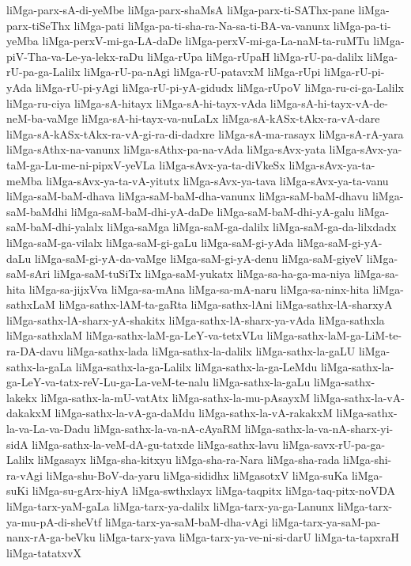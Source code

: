 {liMga-parx-sA-di-yeMbe
liMga-parx-shaMsA
liMga-parx-ti-SAThx-pane
liMga-parx-tiSeThx
liMga-pati
liMga-pa-ti-sha-ra-Na-sa-ti-BA-va-vanunx
liMga-pa-ti-yeMba
liMga-perxV-mi-ga-LA-daDe
liMga-perxV-mi-ga-La-naM-ta-ruMTu
liMga-piV-Tha-va-Le-ya-lekx-raDu
liMga-rUpa
liMga-rUpaH
liMga-rU-pa-dalilx
liMga-rU-pa-ga-Lalilx
liMga-rU-pa-nAgi
liMga-rU-patavxM
liMga-rUpi
liMga-rU-pi-yAda
liMga-rU-pi-yAgi
liMga-rU-pi-yA-gidudx
liMga-rUpoV
liMga-ru-ci-ga-Lalilx
liMga-ru-ciya
liMga-sA-hitayx
liMga-sA-hi-tayx-vAda
liMga-sA-hi-tayx-vA-de-neM-ba-vaMge
liMga-sA-hi-tayx-va-nuLaLx
liMga-sA-kASx-tAkx-ra-vA-dare
liMga-sA-kASx-tAkx-ra-vA-gi-ra-di-dadxre
liMga-sA-ma-rasayx
liMga-sA-rA-yara
liMga-sAthx-na-vanunx
liMga-sAthx-pa-na-vAda
liMga-sAvx-yata
liMga-sAvx-ya-taM-ga-Lu-me-ni-pipxV-yeVLa
liMga-sAvx-ya-ta-diVkeSx
liMga-sAvx-ya-ta-meMba
liMga-sAvx-ya-ta-vA-yitutx
liMga-sAvx-ya-tava
liMga-sAvx-ya-ta-vanu
liMga-saM-baM-dhava
liMga-saM-baM-dha-vanunx
liMga-saM-baM-dhavu
liMga-saM-baMdhi
liMga-saM-baM-dhi-yA-daDe
liMga-saM-baM-dhi-yA-galu
liMga-saM-baM-dhi-yalalx
liMga-saMga
liMga-saM-ga-dalilx
liMga-saM-ga-da-lilxdadx
liMga-saM-ga-vilalx
liMga-saM-gi-gaLu
liMga-saM-gi-yAda
liMga-saM-gi-yA-daLu
liMga-saM-gi-yA-da-vaMge
liMga-saM-gi-yA-denu
liMga-saM-giyeV
liMga-saM-sAri
liMga-saM-tuSiTx
liMga-saM-yukatx
liMga-sa-ha-ga-ma-niya
liMga-sa-hita
liMga-sa-jijxVva
liMga-sa-mAna
liMga-sa-mA-naru
liMga-sa-ninx-hita
liMga-sathxLaM
liMga-sathx-lAM-ta-gaRta
liMga-sathx-lAni
liMga-sathx-lA-sharxyA
liMga-sathx-lA-sharx-yA-shakitx
liMga-sathx-lA-sharx-ya-vAda
liMga-sathxla
liMga-sathxlaM
liMga-sathx-laM-ga-LeY-va-tetxVLu
liMga-sathx-laM-ga-LiM-te-ra-DA-davu
liMga-sathx-lada
liMga-sathx-la-dalilx
liMga-sathx-la-gaLU
liMga-sathx-la-gaLa
liMga-sathx-la-ga-Lalilx
liMga-sathx-la-ga-LeMdu
liMga-sathx-la-ga-LeY-va-tatx-reV-Lu-ga-La-veM-te-nalu
liMga-sathx-la-gaLu
liMga-sathx-lakekx
liMga-sathx-la-mU-vatAtx
liMga-sathx-la-mu-pAsayxM
liMga-sathx-la-vA-dakakxM
liMga-sathx-la-vA-ga-daMdu
liMga-sathx-la-vA-rakakxM
liMga-sathx-la-va-La-va-Dadu
liMga-sathx-la-va-nA-cAyaRM
liMga-sathx-la-va-nA-sharx-yi-sidA
liMga-sathx-la-veM-dA-gu-tatxde
liMga-sathx-lavu
liMga-savx-rU-pa-ga-Lalilx
liMgasayx
liMga-sha-kitxyu
liMga-sha-ra-Nara
liMga-sha-rada
liMga-shi-ra-vAgi
liMga-shu-BoV-da-yaru
liMga-sididhx
liMgasotxV
liMga-suKa
liMga-suKi
liMga-su-gArx-hiyA
liMga-swthxlayx
liMga-taqpitx
liMga-taq-pitx-noVDA
liMga-tarx-yaM-gaLa
liMga-tarx-ya-dalilx
liMga-tarx-ya-ga-Lanunx
liMga-tarx-ya-mu-pA-di-sheVtf
liMga-tarx-ya-saM-baM-dha-vAgi
liMga-tarx-ya-saM-pa-nanx-rA-ga-beVku
liMga-tarx-yava
liMga-tarx-ya-ve-ni-si-darU
liMga-ta-tapxraH
liMga-tatatxvX
}
